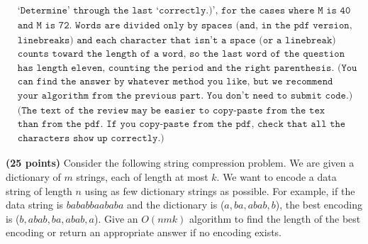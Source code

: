 \documentclass[11pt,letterpaper]{article}
\begin{document}
\begin{solution}
\begin{align*}
        &\texttt{`Determine' through the last `correctly.)', for the cases where M is 40}\\ 
        &\texttt{and M is 72. Words are divided only by spaces (and, in the pdf version,}\\ 
        &\texttt{linebreaks) and each character that isn't a space (or a linebreak)}\\ 
        &\texttt{counts toward the length of a word, so the last word of the question}\\ 
        &\texttt{has length eleven, counting the period and the right parenthesis. (You}\\ 
        &\texttt{can find the answer by whatever method you like, but we recommend coding}\\ 
        &\texttt{your algorithm from the previous part. You don't need to submit code.)}\\ 
        &\texttt{(The text of the review may be easier to copy-paste from the tex source}\\ 
        &\texttt{than from the pdf. If you copy-paste from the pdf, check that all the}\\
        &\texttt{characters show up correctly.)}
    \end{align*}
\end{solution}

\pagebreak
\begin{problem}
    {\bf (25 points)} Consider the following string compression problem.  We are given a dictionary of $m$ strings, each of length at most $k$.  We want to encode a data string of length $n$ using as few dictionary strings as possible.  For example, if the data string is $bababbaababa$ and the dictionary is ($a,ba,abab,b$), the best encoding is ($b,abab,ba,abab,a$).  Give an $O(nmk)$ algorithm to find the length of the best encoding or return an appropriate answer if no encoding exists.
\end{problem}
\end{document}
